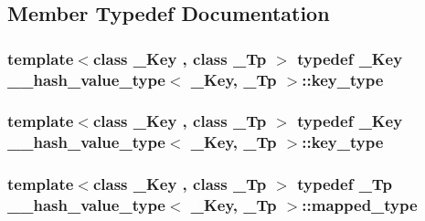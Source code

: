 \subsection{Member Typedef Documentation}
\hypertarget{struct____hash__value__type_ac12affb5081f6691312a6826ffaf6c39}{}
\subsubsection[{key\+\_\+type}]{\setlength{\rightskip}{0pt plus 5cm}template$<$class \+\_\+\+Key , class \+\_\+\+Tp $>$ typedef \+\_\+\+Key {\bf \+\_\+\+\_\+hash\+\_\+value\+\_\+type}$<$ \+\_\+\+Key, \+\_\+\+Tp $>$\+::{\bf key\+\_\+type}}\label{struct____hash__value__type_ac12affb5081f6691312a6826ffaf6c39}
\hypertarget{struct____hash__value__type_ac12affb5081f6691312a6826ffaf6c39}{}
\subsubsection[{key\+\_\+type}]{\setlength{\rightskip}{0pt plus 5cm}template$<$class \+\_\+\+Key , class \+\_\+\+Tp $>$ typedef \+\_\+\+Key {\bf \+\_\+\+\_\+hash\+\_\+value\+\_\+type}$<$ \+\_\+\+Key, \+\_\+\+Tp $>$\+::{\bf key\+\_\+type}}\label{struct____hash__value__type_ac12affb5081f6691312a6826ffaf6c39}
\hypertarget{struct____hash__value__type_a8e898527f944f8e069527adfd8cd838d}{}
\subsubsection[{mapped\+\_\+type}]{\setlength{\rightskip}{0pt plus 5cm}template$<$class \+\_\+\+Key , class \+\_\+\+Tp $>$ typedef \+\_\+\+Tp {\bf \+\_\+\+\_\+hash\+\_\+value\+\_\+type}$<$ \+\_\+\+Key, \+\_\+\+Tp $>$\+::{\bf mapped\+\_\+type}}\label{struct____hash__value__type_a8e898527f944f8e069527adfd8cd838d}
\hypertarget{struct____hash__value__type_a8e898527f944f8e069527adfd8cd838d}{}

